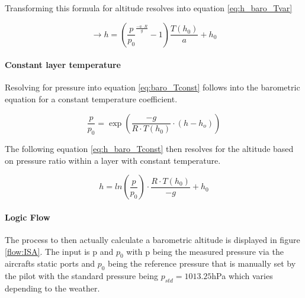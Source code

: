 Transforming this formula for altitude resolves into equation \ref{eq:h_baro_Tvar}

\begin{equation}
    \rightarrow h = \left(\frac{p}{p_0}^{\frac{-a \cdot R}{g}}-1\right)\frac{T(h_0)}{a}+h_0
    \label{eq:h_baro_Tvar}
\end{equation}

\paragraph{Constant layer temperature}

Resolving for pressure into equation \ref{eq:baro_Tconst} follows into the barometric equation for a constant temperature coefficient.

\begin{equation}
    \frac{p}{p_0}= \exp\left(\frac{-g}{R \cdot T(h_0)}\cdot(h-h_o)\right)
    \label{eq:baro_Tconst}
\end{equation}


The following equation \ref{eq:h_baro_Tconst} then resolves for the altitude based on pressure ratio within a layer with constant temperature.


\begin{equation}
    h = ln(\frac{p}{p_0})\cdot \frac{R \cdot T(h_0)}{-g}+h_0
    \label{eq:h_baro_Tconst}
\end{equation}

\paragraph{Logic Flow}

The process to then actually calculate a barometric altitude is displayed in figure \ref{flow:ISA}. The input is p and $p_0$ with p being the measured pressure via the aircrafts static ports and $p_0$ being the reference pressure that is manually set by the pilot with the standard pressure being $p_{std} = 1013.25$hPa which varies depending to the weather.


